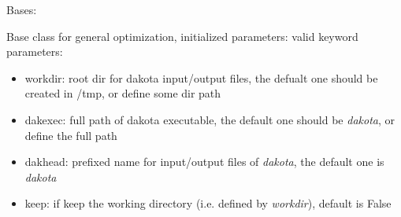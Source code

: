 \documentclass[letterpaper,10pt,english]{sphinxmanual}
\begin{document}
\begin{fulllineitems}
\label{src/apidocs/dakopt:genopt.dakopt.DakotaBase}
Bases: \href{https://docs.python.org/2/library/functions.html\#object}{}

Base class for general optimization, initialized parameters:
valid keyword parameters:
\begin{itemize}
\item {} 
workdir: root dir for dakota input/output files,
the defualt one should be created in /tmp, or define some dir path

\item {} 
dakexec: full path of dakota executable,
the default one should be \emph{dakota}, or define the full path

\item {} 
dakhead: prefixed name for input/output files of \emph{dakota}, 
the default one is \emph{dakota}

\item {} 
keep: if keep the working directory (i.e. defined by \emph{workdir}), default is False

\end{itemize}

\begin{fulllineitems}
\label{src/apidocs/dakopt:genopt.dakopt.DakotaBase.dakexec}
\end{fulllineitems}


\begin{fulllineitems}
\label{src/apidocs/dakopt:genopt.dakopt.DakotaBase.dakhead}
\end{fulllineitems}


\begin{fulllineitems}
\label{src/apidocs/dakopt:genopt.dakopt.DakotaBase.keep}
\end{fulllineitems}


\begin{fulllineitems}
\label{src/apidocs/dakopt:genopt.dakopt.DakotaBase.workdir}
\end{fulllineitems}


\end{fulllineitems}
\end{document}
